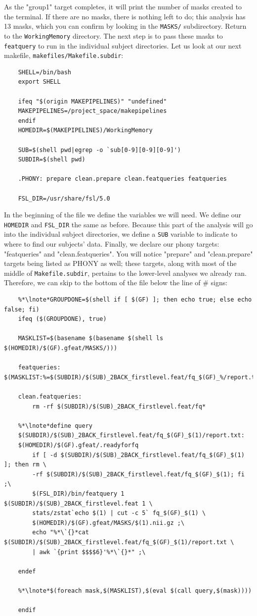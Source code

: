 As the "group1" target completes, it will print the number of masks created to the terminal. If there are no masks, there is nothing left to do; this analysis has 13 masks, which you can confirm by looking in the \texttt{MASKS/} subdirectory. Return to the \texttt{WorkingMemory} directory. The next step is to pass these masks to \texttt{featquery} to run in the individual subject directories. Let us look at our next makefile, \texttt{makefiles/Makefile.subdir}:

\begin{lstlisting}
	SHELL=/bin/bash
	export SHELL
	
	ifeq "$(origin MAKEPIPELINES)" "undefined"
	MAKEPIPELINES=/project_space/makepipelines
	endif
	HOMEDIR=$(MAKEPIPELINES)/WorkingMemory
	
	SUB=$(shell pwd|egrep -o `sub[0-9][0-9][0-9]')
	SUBDIR=$(shell pwd)
	
	.PHONY: prepare clean.prepare clean.featqueries featqueries

	FSL_DIR=/usr/share/fsl/5.0
\end{lstlisting}

In the beginning of the file we define the variables we will need. We define our \texttt{HOMEDIR} and \texttt{FSL_DIR} the same as before. Because this part of the analysis will go into the individual subject directories, we define a \texttt{SUB} variable to indicate to \maken{} where to find our subjects' data. Finally, we declare our phony targets: "featqueries" and "clean.featqueries". You will notice "prepare" and "clean.prepare" targets being listed as PHONY as well; these targets, along with most of the middle of \texttt{Makefile.subdir}, pertains to the lower-level analyses we already ran. Therefore, we can skip to the bottom of the file below the line of \# signs:
\begin{lstlisting}	
	%*\lnote*GROUPDONE=$(shell if [ $(GF) ]; then echo true; else echo false; fi)
	ifeq ($(GROUPDONE), true)
	
	MASKLIST=$(basename $(basename $(shell ls $(HOMEDIR)/$(GF).gfeat/MASKS/)))
	
	featqueries: $(MASKLIST:%=$(SUBDIR)/$(SUB)_2BACK_firstlevel.feat/fq_$(GF)_%/report.txt)
	
	clean.featqueries:
		rm -rf $(SUBDIR)/$(SUB)_2BACK_firstlevel.feat/fq*
	
	%*\lnote*define query
	$(SUBDIR)/$(SUB)_2BACK_firstlevel.feat/fq_$(GF)_$(1)/report.txt: 
	$(HOMEDIR)/$(GF).gfeat/.readyforfq
		if [ -d $(SUBDIR)/$(SUB)_2BACK_firstlevel.feat/fq_$(GF)_$(1) ]; then rm \
		-rf $(SUBDIR)/$(SUB)_2BACK_firstlevel.feat/fq_$(GF)_$(1); fi ;\
		$(FSL_DIR)/bin/featquery 1 $(SUBDIR)/$(SUB)_2BACK_firstlevel.feat 1 \
		stats/zstat`echo $(1) | cut -c 5` fq_$(GF)_$(1) \
		$(HOMEDIR)/$(GF).gfeat/MASKS/$(1).nii.gz ;\
		echo "%*\`{}*cat $(SUBDIR)/$(SUB)_2BACK_firstlevel.feat/fq_$(GF)_$(1)/report.txt \
		| awk `{print $$$$6}'%*\`{}*" ;\
		
	endef
	
	%*\lnote*$(foreach mask,$(MASKLIST),$(eval $(call query,$(mask))))
	
	endif
\end{lstlisting}

